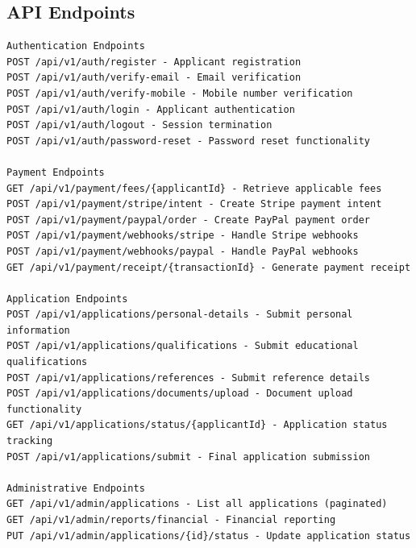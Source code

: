 \documentclass[11pt]{article}
\begin{document}
\subsection{API Endpoints}
\begin{verbatim}
Authentication Endpoints
POST /api/v1/auth/register - Applicant registration
POST /api/v1/auth/verify-email - Email verification
POST /api/v1/auth/verify-mobile - Mobile number verification
POST /api/v1/auth/login - Applicant authentication
POST /api/v1/auth/logout - Session termination
POST /api/v1/auth/password-reset - Password reset functionality

Payment Endpoints
GET /api/v1/payment/fees/{applicantId} - Retrieve applicable fees
POST /api/v1/payment/stripe/intent - Create Stripe payment intent
POST /api/v1/payment/paypal/order - Create PayPal payment order
POST /api/v1/payment/webhooks/stripe - Handle Stripe webhooks
POST /api/v1/payment/webhooks/paypal - Handle PayPal webhooks
GET /api/v1/payment/receipt/{transactionId} - Generate payment receipt

Application Endpoints
POST /api/v1/applications/personal-details - Submit personal information
POST /api/v1/applications/qualifications - Submit educational qualifications
POST /api/v1/applications/references - Submit reference details
POST /api/v1/applications/documents/upload - Document upload functionality
GET /api/v1/applications/status/{applicantId} - Application status tracking
POST /api/v1/applications/submit - Final application submission

Administrative Endpoints
GET /api/v1/admin/applications - List all applications (paginated)
GET /api/v1/admin/reports/financial - Financial reporting
PUT /api/v1/admin/applications/{id}/status - Update application status
\end{verbatim}
\end{document}
